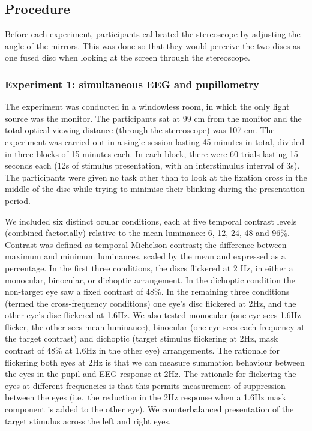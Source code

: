 \documentclass[
]{article}
\begin{document}
\hypertarget{procedure}{%
\subsection{Procedure}\label{procedure}}

Before each experiment, participants calibrated the stereoscope by adjusting the angle of the mirrors. This was done so that they would perceive the two discs as one fused disc when looking at the screen through the stereoscope.

\hypertarget{experiment-1-simultaneous-eeg-and-pupillometry}{%
\subsubsection{Experiment 1: simultaneous EEG and pupillometry}\label{experiment-1-simultaneous-eeg-and-pupillometry}}

The experiment was conducted in a windowless room, in which the only light source was the monitor. The participants sat at 99 cm from the monitor and the total optical viewing distance (through the stereoscope) was 107 cm. The experiment was carried out in a single session lasting 45 minutes in total, divided in three blocks of 15 minutes each. In each block, there were 60 trials lasting 15 seconds each (12s of stimulus presentation, with an interstimulus interval of 3s). The participants were given no task other than to look at the fixation cross in the middle of the disc while trying to minimise their blinking during the presentation period.

We included six distinct ocular conditions, each at five temporal contrast levels (combined factorially) relative to the mean luminance: 6, 12, 24, 48 and 96\%. Contrast was defined as temporal Michelson contrast; the difference between maximum and minimum luminances, scaled by the mean and expressed as a percentage. In the first three conditions, the discs flickered at 2 Hz, in either a monocular, binocular, or dichoptic arrangement. In the dichoptic condition the non-target eye saw a fixed contrast of 48\%. In the remaining three conditions (termed the cross-frequency conditions) one eye's disc flickered at 2Hz, and the other eye's disc flickered at 1.6Hz. We also tested monocular (one eye sees 1.6Hz flicker, the other sees mean luminance), binocular (one eye sees each frequency at the target contrast) and dichoptic (target stimulus flickering at 2Hz, mask contrast of 48\% at 1.6Hz in the other eye) arrangements. The rationale for flickering both eyes at 2Hz is that we can measure summation behaviour between the eyes in the pupil and EEG response at 2Hz. The rationale for flickering the eyes at different frequencies is that this permits measurement of suppression between the eyes (i.e.~the reduction in the 2Hz response when a 1.6Hz mask component is added to the other eye). We counterbalanced presentation of the target stimulus across the left and right eyes.
\end{document}
